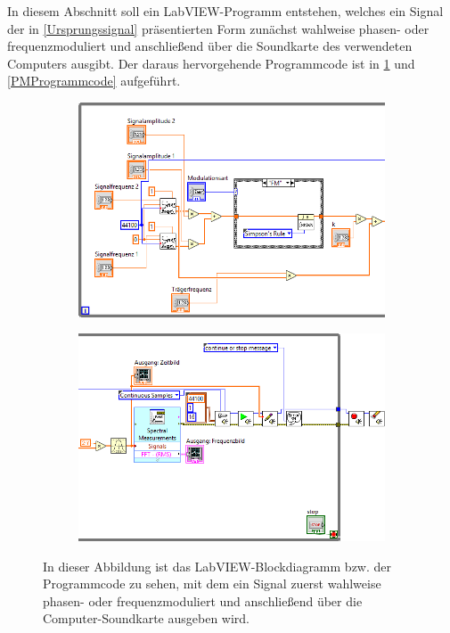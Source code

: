 \documentclass[
a4paper,
12pt,
pagesize,
ngerman
]{scrartcl}
\begin{document}
	In diesem Abschnitt soll ein LabVIEW-Programm entstehen, welches ein Signal der in \cref{Ursprungssignal} präsentierten Form zunächst wahlweise phasen- oder frequenzmoduliert und anschließend über die Soundkarte des verwendeten Computers ausgibt. 
	Der daraus hervorgehende Programmcode ist in \cref{FMProgrammcode} und \cref{PMProgrammcode} aufgeführt.
	
	\begin{figure}[H]
		\centering
		\begin{subfigure}[t]{0.69\textwidth}
			\centering
			\includegraphics[width=1.0\textwidth]{EIRE2018Dateien/Tag4/FMPM-Erzeugung/FMPM-ErzeugungdTeil1}
		\end{subfigure}
		
		\vspace{0,2cm}
		
		\begin{subfigure}[t]{0.72\textwidth}
			\centering
			\includegraphics[width=1.0\textwidth]{EIRE2018Dateien/Tag4/FMPM-Erzeugung/FMPM-ErzeugungdTeil2}
		\end{subfigure}
		\caption{In dieser Abbildung ist das LabVIEW-Blockdiagramm bzw. der Programmcode zu sehen, mit dem ein Signal zuerst wahlweise phasen- oder frequenzmoduliert und anschließend über die Computer-Soundkarte ausgeben wird.}
		\label{FMProgrammcode}
	\end{figure}
	
\end{document}
